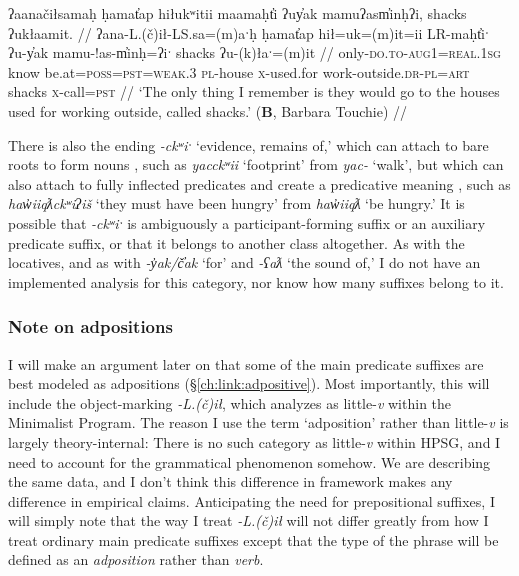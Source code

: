 \ex \label{ex:uyak}
\begingl
\glpreamble ʔaanačiłsamaḥ ḥamat̓ap hiłukʷitii maamaḥt̓i ʔuy̓ak mamuʔasm̓inḥʔi, shacks ʔukłaamit. //
\gla ʔana-L.(č)ił-LS.sa=(m)aˑḥ ḥamat̓ap hił=uk=(m)it=ii LR-maḥt̓iˑ ʔu-y̓ak mamu-!as-m̓inḥ=ʔiˑ shacks ʔu-(k)łaˑ=(m)it //
\glb only-\textsc{do.to}-\textsc{aug1}=\textsc{real.1sg} know be.at=\textsc{poss}=\textsc{pst}=\textsc{weak.3} \textsc{pl}-house \textsc{x}-used.for work-outside.\textsc{dr}-\textsc{pl}=\textsc{art} shacks \textsc{x}-call=\textsc{pst} //
\glft `The only thing I remember is they would go to the houses used for working outside, called shacks.' (\textbf{B}, Barbara Touchie) //
\endgl
\xe

There is also the ending \textit{-ckʷiˑ} `evidence, remains of,' which can attach to bare roots to form nouns \citep[p.~20--22]{jacobsen1986}, such as \textit{yacckʷii} `footprint' from \textit{yac-} `walk', but which can also attach to fully inflected predicates and create a predicative meaning \citep[p.~73--75]{waldie2012}, such as \textit{haw̓iiqƛckʷiʔiš} `they must have been hungry' from \textit{haw̓iiqƛ} `be hungry.' It is possible that \textit{-ckʷiˑ} is ambiguously a participant-forming suffix or an auxiliary predicate suffix, or that it belongs to another class altogether. As with the locatives, and as with \textit{-y̓ak/č̓ak} `for' and \textit{-ʕaƛ} `the sound of,' I do not have an implemented analysis for this category, nor know how many suffixes belong to it.

\subsubsection{Note on adpositions} \label{ch:clause:2pv:adp}

I will make an argument later on that some of the main predicate suffixes are best modeled as adpositions (\S\ref{ch:link:adpositive}). Most importantly, this will include the object-marking \textit{-L.(č)ił}, which \citet{woo2007b} analyzes as little-\textit{v} within the Minimalist Program. The reason I use the term `adposition' rather than little-\textit{v} is largely theory-internal: There is no such category as little-\textit{v} within HPSG, and I need to account for the grammatical phenomenon somehow. We are describing the same data, and I don't think this difference in framework makes any difference in empirical claims. Anticipating the need for prepositional suffixes, I will simply note that the way I treat \textit{-L.(č)ił} will not differ greatly from how I treat ordinary main predicate suffixes except that the type of the phrase will be defined as an \textit{adposition} rather than \textit{verb}.

